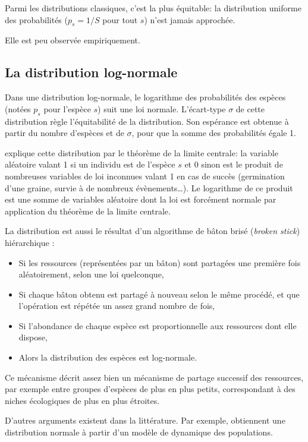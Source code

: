 \documentclass[
  11pt,
  french,
  a4paper,
  extrafontsizes,onecolumn,openright
  ]{memoir}
\providecommand{\tightlist}{%
  \setlength{\itemsep}{0pt}\setlength{\parskip}{0pt}}
\begin{document}
Parmi les distributions classiques, c'est la plus équitable: la distribution uniforme des probabilités (\(p_s=1/S\) pour tout \(s\)) n'est jamais approchée.

Elle est peu observée empiriquement.

\subsection{La distribution log-normale}\label{la-distribution-log-normale}

Dans une distribution log-normale, le logarithme des probabilités des espèces (notées \(p_s\) pour l'espèce \(s\)) suit une loi normale.
L'écart-type \(\sigma\) de cette distribution règle l'équitabilité de la distribution.
Son espérance est obtenue à partir du nombre d'espèces et de \(\sigma\), pour que la somme des probabilités égale 1.

\textcite{May1975} explique cette distribution par le théorème de la limite centrale: la variable aléatoire valant 1 si un individu est de l'espèce \(s\) et 0 sinon est le produit de nombreuses variables de loi inconnues valant 1 en cas de succès (germination d'une graine, survie à de nombreux évènements\ldots).
Le logarithme de ce produit est une somme de variables aléatoire dont la loi est forcément normale par application du théorème de la limite centrale.

La distribution est aussi le résultat d'un algorithme de bâton brisé (\emph{broken stick}) hiérarchique \autocite{Bulmer1974}:

\begin{itemize}
\tightlist
\item
  Si les ressources (représentées par un bâton) sont partagées une première fois aléatoirement, selon une loi quelconque,
\item
  Si chaque bâton obtenu est partagé à nouveau selon le même procédé, et que l'opération est répétée un assez grand nombre de fois,
\item
  Si l'abondance de chaque espèce est proportionnelle aux ressources dont elle dispose,
\item
  Alors la distribution des espèces est log-normale.
\end{itemize}

Ce mécanisme décrit assez bien un mécanisme de partage successif des ressources, par exemple entre groupes d'espèces de plus en plus petits, correspondant à des niches écologiques de plus en plus étroites.

D'autres arguments existent dans la littérature.
Par exemple, \textcite{Engen1996} obtiennent une distribution normale à partir d'un modèle de dynamique des populations.
\end{document}
